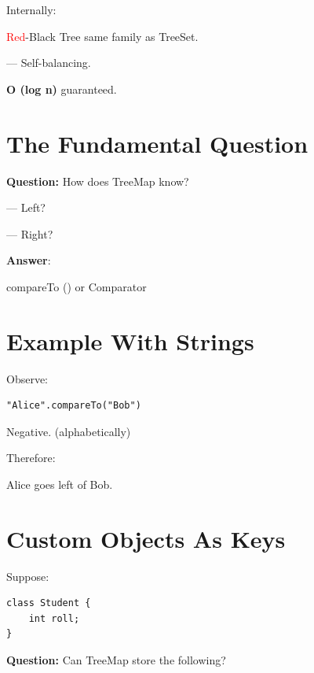 \documentclass[11pt,a4paper]{book}
\newcommand{\question}[1]{
\vspace{0.5em}
\textbf{Question:} #1?
\vspace{0.2em}
}
\begin{document}
Internally:

\textcolor{red}{Red}-Black Tree
same family as \textcolor{RosettaJade}{TreeSet}.

    --- Self-balancing.

{\textbf{O (log n)} guaranteed}.


\section{The Fundamental Question}

\question{How does TreeMap know}

    --- Left?

    --- Right?

\textbf{Answer}:

\textcolor{RosettaRoyalPurple}{compareTo} () or
\textcolor{RosettaJade}{Comparator}


\section{Example With Strings}

Observe:

\begin{verbatim} 
"Alice".compareTo("Bob")
\end{verbatim}

\textcolor{RosettaOrange}{Negative}. (alphabetically)

Therefore:

Alice goes {\ttfamily left} of Bob.


\section{Custom Objects As Keys}

Suppose:

\begin{verbatim} 
class Student {
    int roll;
}
\end{verbatim}


\question{Can TreeMap store the following}
\end{document}
